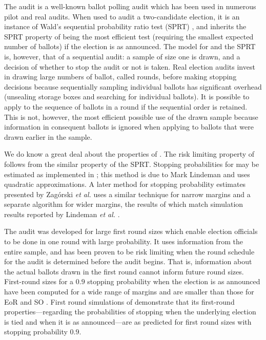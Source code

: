 The \BRAVO audit \cite{bravo} is a well-known ballot polling audit which has been used in numerous pilot and real audits. When used to audit a two-candidate election, it is an instance of Wald's sequential probability ratio test (SPRT) \cite{wald}, and inherits the SPRT property of being the most efficient test (requiring the smallest expected number of ballots) if the election is as announced. The model for \BRAVO and the SPRT is, however, that of a sequential audit: a sample of size one is drawn, and a decision of whether to stop the audit or not is taken. Real election audits invest in drawing large numbers of ballot, called rounds, before making stopping decisions because sequentially sampling individual ballots has significant overhead (unsealing storage boxes and searching for individual ballots). It is possible to apply \BRAVO to the sequence of ballots in a round if the sequential order is retained. This is not, however, the most efficient possible use of the drawn sample because information in consequent ballots is ignored when applying \BRAVO to ballots that were drawn earlier in the sample. 

We do know a great deal about the properties of \BRAVO. The risk limiting property of \BRAVO follows from the similar property of the SPRT. Stopping probabilities for \BRAVO may be estimated as implemented in \cite{arlo}; this method is due to Mark Lindeman and uses quadratic approximations. A later method for stopping probability estimates presented by Zag{\'o}rski {\em et al.}\cite{usenix_minerva,arxiv_athena} uses a similar technique for narrow margins and a separate algorithm for wider margins, the results of which match simulation results reported by Lindeman {\em et al.} \cite[Table 1]{bravo}.  

The \Minerva audit \cite{usenix_minerva,arxiv_athena} was developed for large first round sizes which enable election officials to be done in one round with large probability. It uses information from the entire sample, and has been proven to be risk limiting when the round schedule for the audit is determined before the audit begins. That is, information about the actual ballots drawn in the first round cannot inform future round sizes. First-round sizes for a $0.9$ stopping probability when the election is as announced have been computed for a wide range of margins and are smaller than those for EoR and SO \BRAVO. First round simulations of \Minerva \cite{arxiv_athena} demonstrate that its first-round properties---regarding the probabilities of stopping when the underlying election is tied and when it is as announced---are as predicted for first round sizes with stopping probability $0.9$. 

